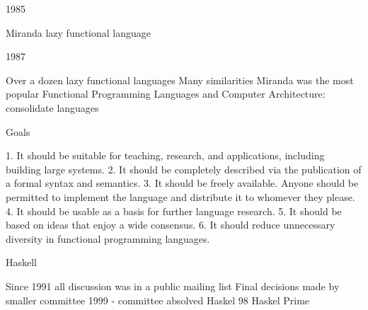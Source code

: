 \begin{frame}
1985

Miranda
lazy functional language
\end{frame}

\begin{frame}
1987

Over a dozen lazy functional languages  
Many similarities
Miranda was the most popular
Functional Programming Languages and Computer Architecture: consolidate languages
\end{frame}

\begin{frame}
Goals

1. It should be suitable for teaching, research, and applications,
including building large systems.
2. It should be completely described via the publication of a formal
syntax and semantics.
3. It should be freely available. Anyone should be permitted to
implement the language and distribute it to whomever they
please.
4. It should be usable as a basis for further language research.
5. It should be based on ideas that enjoy a wide consensus.
6. It should reduce unnecessary diversity in functional programming
languages.

\end{frame}

\begin{frame}
Haskell

Since 1991 all discussion was in a public mailing list
Final decisions made by smaller committee
1999 - committee absolved
Haskel 98
Haskel Prime
\end{frame}
